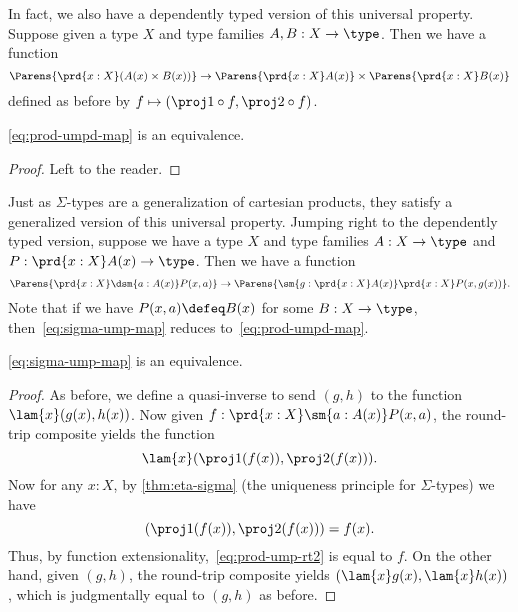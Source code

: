 In fact, we also have a dependently typed version of this universal property.
Suppose given a type $X$ and type families $A,B:X\to \type$.
Then we have a function
\begin{equation}\label{eq:prod-umpd-map}
  \Parens{\prd{x:X} (A(x)\times B(x))} \to \Parens{\prd{x:X} A(x)} \times \Parens{\prd{x:X} B(x)}
\end{equation}
defined as before by $f \mapsto (\proj1 \circ f, \proj2\circ f)$.

\begin{thm}\label{thm:prod-umpd}
  \eqref{eq:prod-umpd-map} is an equivalence.
\end{thm}
\begin{proof}
  Left to the reader.
\end{proof}

Just as $\Sigma$-types are a generalization of cartesian products, they satisfy a generalized version of this universal property.
Jumping right to the dependently typed version, suppose we have a type $X$ and type families $A:X\to \type$ and $P:\prd{x:X} A(x)\to\type$.
Then we have a function
%
\begin{equation}
  \label{eq:sigma-ump-map}
  \Parens{\prd{x:X}\dsm{a:A(x)} P(x,a)} \to
  \Parens{\sm{g:\prd{x:X} A(x)} \prd{x:X} P(x,g(x))}.
\end{equation}
Note that if we have $P(x,a) \defeq B(x)$ for some $B:X\to\type$, then~\eqref{eq:sigma-ump-map} reduces to~\eqref{eq:prod-umpd-map}.

\begin{thm}\label{thm:ttac}
  \eqref{eq:sigma-ump-map} is an equivalence.
\end{thm}
\begin{proof}
  As before, we define a quasi-inverse to send $(g,h)$ to the function $\lam{x} (g(x),h(x))$.
  Now given $f:\prd{x:X} \sm{a:A(x)} P(x,a)$, the round-trip composite yields the function
  \begin{equation}
    \lam{x} (\proj1(f(x)),\proj2(f(x))).\label{eq:prod-ump-rt2}
  \end{equation}
  Now for any $x:X$, by \cref{thm:eta-sigma} (the uniqueness principle for $\Sigma$-types) we have
  \begin{equation*}
    (\proj1(f(x)),\proj2(f(x))) = f(x).
  \end{equation*}
  Thus, by function extensionality,~\eqref{eq:prod-ump-rt2} is equal to $f$.
  On the other hand, given $(g,h)$, the round-trip composite yields $(\lam {x} g(x),\lam{x} h(x))$, which is judgmentally equal to $(g,h)$ as before.
\end{proof}

